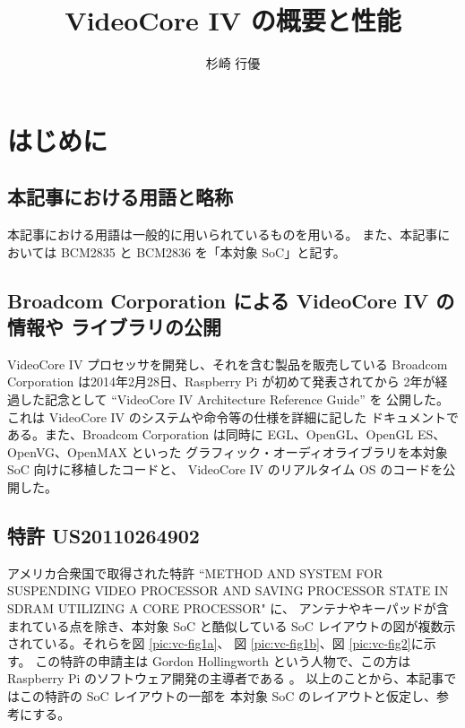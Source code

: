 \documentclass{jsarticle}
\title{VideoCore IV の概要と性能}
\author{杉崎 行優}
\begin{document}
\maketitle{}
\tableofcontents
\newpage

\section{はじめに}

\subsection{本記事における用語と略称}

本記事における用語は一般的に用いられているものを用いる。
また、本記事においては BCM2835 と BCM2836 を「本対象 SoC」と記す。

\subsection{Broadcom Corporation による VideoCore IV の情報や
ライブラリの公開}

VideoCore IV プロセッサを開発し、それを含む製品を販売している
Broadcom Corporation は2014年2月28日、Raspberry Pi が初めて発表されてから
2年が経過した記念として ``VideoCore IV Architecture Reference Guide'' を
公開した。これは VideoCore IV のシステムや命令等の仕様を詳細に記した
ドキュメントである。また、Broadcom Corporation は同時に
EGL、OpenGL、OpenGL ES、OpenVG、OpenMAX といった
グラフィック・オーディオライブラリを本対象 SoC 向けに移植したコードと、
VideoCore IV のリアルタイム OS のコードを公開した。

\subsection{特許 US20110264902}

アメリカ合衆国で取得された特許
``METHOD AND SYSTEM FOR SUSPENDING VIDEO PROCESSOR AND SAVING PROCESSOR
STATE IN SDRAM UTILIZING A CORE PROCESSOR" \cite{vc-patent} に、
アンテナやキーパッドが含まれている点を除き、本対象 SoC と酷似している
SoC レイアウトの図が複数示されている。それらを図 \ref{pic:vc-fig1a}、
図 \ref{pic:vc-fig1b}、図 \ref{pic:vc-fig2}に示す。
この特許の申請主は Gordon Hollingworth という人物で、この方は
Raspberry Pi のソフトウェア開発の主導者である \cite{gh-1} \cite{gh-2}
\cite{gh-3} \cite{gh-4} \cite{gh-5} \cite{gh-6}。
以上のことから、本記事ではこの特許の SoC レイアウトの一部を
本対象 SoC のレイアウトと仮定し、参考にする。
\end{document}
